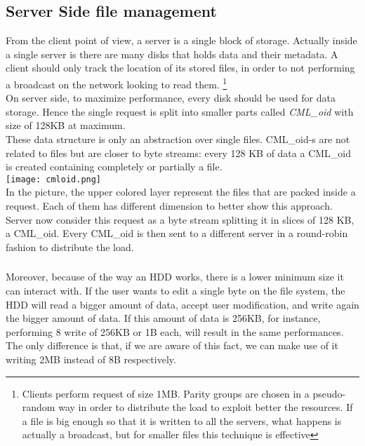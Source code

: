 \subsection{Server Side file management}
From the client point of view, a server is a single block of storage. Actually
inside a single server is there are many disks that holds data and their
metadata. A client should only track the location of its stored files, in order
to not performing a broadcast on the network looking to read them. 
\footnote{Clients perform request of size 1MB. Parity groups are chosen in a
pseudo-random way in order to distribute the load to exploit better the
resources. If a file is big enough so that it is written to all the servers,
what happens is actually a broadcast, but for smaller files this technique is
effective} \\
On server side, to maximize performance, every disk should be used for data
storage. Hence the single request is split into smaller parts called
\textit{CML\_oid} with size of 128KB at maximum. \\
These data structure is only an abstraction over single files. CML\_oid-s are not
related to files but are closer to byte streams: every 128 KB of data a CML\_oid
is created containing completely or partially a file. \\
\vspace{0.5cm}
\texttt{[image: cmloid.png]} \\
In the picture, the upper colored layer represent the files that are packed inside
a request. Each of them has different dimension to better show this approach.
Server now consider this request as a byte stream splitting it in slices of 128
KB, a CML\_oid. Every CML\_oid is then sent to a different server in a
round-robin fashion to distribute the load.

\subsubsection*{}
Moreover, because of the way an HDD works, there is a lower minimum size it can
interact with. If the user wants to edit a single byte on the file system, the
HDD will read a bigger amount of data, accept user modification, and write again
the bigger amount of data. If this amount of data is 256KB, for instance,
performing 8 write of 256KB or 1B each, will result in the same performances.
The only difference is that, if we are aware of this fact, we can make use of it
writing 2MB instead of 8B respectively.

